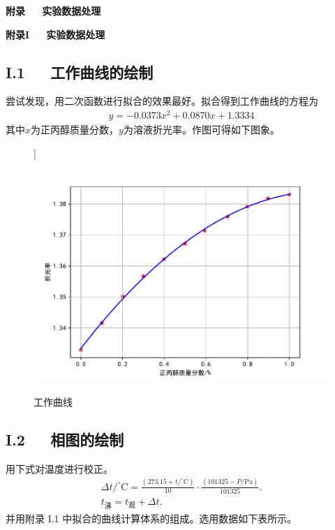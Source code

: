\documentclass[12pt]{ctexart}
\numberwithin{equation}{section}
\begin{document}
\begin{center}
    \LARGE\bfseries{附录~~~实验数据处理}
\end{center}
\begin{center}
    \Large\bfseries{附录I~~~实验数据处理}
\end{center}

\subsection*{I.1~~~工作曲线的绘制}
尝试发现，用二次函数进行拟合的效果最好。拟合得到工作曲线的方程为
\begin{align}
    y = -0.0373 x^2 + 0.0870 x + 1.3334
    \tag*{(I.1)}
\end{align}
其中$x$为正丙醇质量分数，$y$为溶液折光率。作图可得如下图象。
\begin{figure}[!h]]
    \centering
    \includegraphics[scale=1.0]{gongzuoquxian.pdf}
    \caption{工作曲线}
\end{figure}

\subsection*{I.2~~~相图的绘制}
用下式对温度进行校正。
\begin{gather}
    \Delta t / ^\circ\text{C}
    = \frac{(273.15 + t/^\circ\text{C})}{10}
    \cdot \frac{(101325 - P/\text{Pa})}{101325}.
    \tag*{(I.2)} \\
    t_{\text{沸}} = t_{\text{观}} + \Delta t.
    \tag*{(I.3)}
\end{gather}
并用附录 I.1 中拟合的曲线计算体系的组成。选用数据如下表所示。
\end{document}
